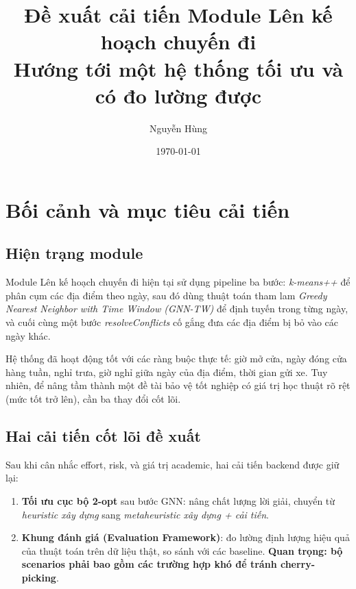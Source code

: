 \documentclass[12pt,a4paper]{report}
\begin{document}
\title{Đề xuất cải tiến Module Lên kế hoạch chuyến đi \\
\large Hướng tới một hệ thống tối ưu và có đo lường được}
\author{Nguyễn Hùng}
\date{\today}
\maketitle

\tableofcontents

\chapter{Bối cảnh và mục tiêu cải tiến}

\section{Hiện trạng module}

Module Lên kế hoạch chuyến đi hiện tại sử dụng pipeline ba bước: \textit{k-means++} để phân cụm các địa điểm theo ngày, sau đó dùng thuật toán tham lam \textit{Greedy Nearest Neighbor with Time Window (GNN-TW)} để định tuyến trong từng ngày, và cuối cùng một bước \textit{resolveConflicts} cố gắng đưa các địa điểm bị bỏ vào các ngày khác.

Hệ thống đã hoạt động tốt với các ràng buộc thực tế: giờ mở cửa, ngày đóng cửa hàng tuần, nghỉ trưa, giờ nghỉ giữa ngày của địa điểm, thời gian gửi xe. Tuy nhiên, để nâng tầm thành một đề tài bảo vệ tốt nghiệp có giá trị học thuật rõ rệt (mức tốt trở lên), cần ba thay đổi cốt lõi.

\section{Hai cải tiến cốt lõi đề xuất}

Sau khi cân nhắc effort, risk, và giá trị academic, hai cải tiến backend được giữ lại:

\begin{enumerate}
    \item \textbf{Tối ưu cục bộ 2-opt} sau bước GNN: nâng chất lượng lời giải, chuyển từ \textit{heuristic xây dựng} sang \textit{metaheuristic xây dựng + cải tiến}.
    \item \textbf{Khung đánh giá (Evaluation Framework)}: đo lường định lượng hiệu quả của thuật toán trên dữ liệu thật, so sánh với các baseline. \textbf{Quan trọng: bộ scenarios phải bao gồm các trường hợp khó để tránh cherry-picking}.
\end{enumerate}
\end{document}
